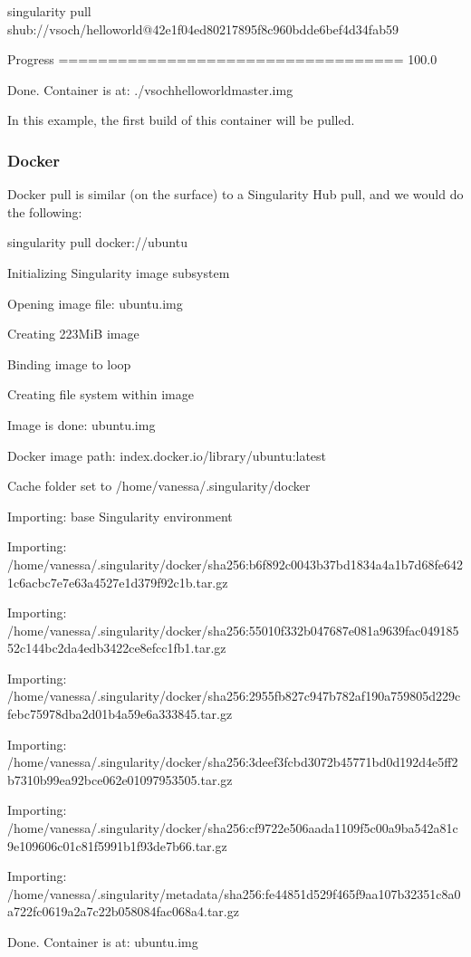 \documentclass[letterpaper,10pt,english]{sphinxmanual}
\begin{document}
%
\begin{sphinxVerbatim}[commandchars=\\\{\}]
singularity pull shub://vsoch/hello\PYGZhy{}world@42e1f04ed80217895f8c960bdde6bef4d34fab59

Progress \textbar{}===================================\textbar{} 100.0\PYGZpc{}

Done. Container is at: ./vsoch\PYGZhy{}hello\PYGZhy{}world\PYGZhy{}master.img
\end{sphinxVerbatim}

In this example, the first build of this container will be pulled.


\subsubsection{Docker}
\label{\detokenize{appendix:id34}}
Docker pull is similar (on the surface) to a Singularity Hub pull, and
we would do the following:

%
\begin{sphinxVerbatim}[commandchars=\\\{\}]
singularity pull docker://ubuntu

Initializing Singularity image subsystem

Opening image file: ubuntu.img

Creating 223MiB image

Binding image to loop

Creating file system within image

Image is done: ubuntu.img

Docker image path: index.docker.io/library/ubuntu:latest

Cache folder set to /home/vanessa/.singularity/docker

Importing: base Singularity environment

Importing: /home/vanessa/.singularity/docker/sha256:b6f892c0043b37bd1834a4a1b7d68fe6421c6acbc7e7e63a4527e1d379f92c1b.tar.gz

Importing: /home/vanessa/.singularity/docker/sha256:55010f332b047687e081a9639fac04918552c144bc2da4edb3422ce8efcc1fb1.tar.gz

Importing: /home/vanessa/.singularity/docker/sha256:2955fb827c947b782af190a759805d229cfebc75978dba2d01b4a59e6a333845.tar.gz

Importing: /home/vanessa/.singularity/docker/sha256:3deef3fcbd3072b45771bd0d192d4e5ff2b7310b99ea92bce062e01097953505.tar.gz

Importing: /home/vanessa/.singularity/docker/sha256:cf9722e506aada1109f5c00a9ba542a81c9e109606c01c81f5991b1f93de7b66.tar.gz

Importing: /home/vanessa/.singularity/metadata/sha256:fe44851d529f465f9aa107b32351c8a0a722fc0619a2a7c22b058084fac068a4.tar.gz

Done. Container is at: ubuntu.img
\end{sphinxVerbatim}
\end{document}
